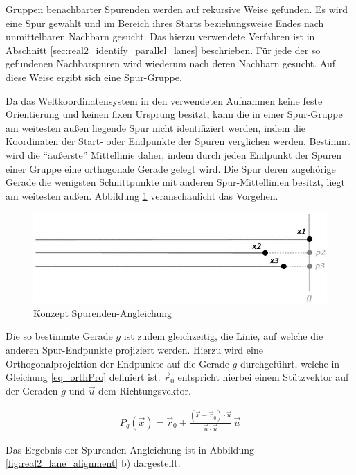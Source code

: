 Gruppen benachbarter Spurenden werden auf rekursive Weise gefunden. Es wird eine Spur gewählt und im
Bereich ihres Starts beziehungsweise Endes nach unmittelbaren Nachbarn gesucht. Das hierzu verwendete
Verfahren ist in Abschnitt \ref{sec:real2_identify_parallel_lanes} beschrieben. Für jede der so gefundenen
Nachbarspuren wird wiederum nach deren Nachbarn gesucht. Auf diese Weise ergibt sich eine Spur-Gruppe.

Da das Weltkoordinatensystem in den verwendeten Aufnahmen keine feste Orientierung und keinen fixen Ursprung besitzt,
kann die in einer Spur-Gruppe am weitesten außen liegende Spur nicht identifiziert werden, indem die
Koordinaten der Start- oder Endpunkte der Spuren verglichen werden.
Bestimmt wird die ``äußerste'' Mittellinie daher, indem durch jeden Endpunkt der Spuren einer Gruppe
eine orthogonale Gerade gelegt wird. Die Spur deren zugehörige Gerade die wenigsten Schnittpunkte
mit anderen Spur-Mittellinien besitzt, liegt am weitesten außen. Abbildung \ref{fig:real2_lane_alignment_concept}
veranschaulicht das Vorgehen.

\begin{figure}[H]
    \centering
    \includegraphics[width=0.5\linewidth]{resources/img/umsetzung/U2/LaneAlignment_concept}
    \caption{Konzept Spurenden-Angleichung}
    \label{fig:real2_lane_alignment_concept}
\end{figure}

Die so bestimmte Gerade $g$ ist zudem gleichzeitig, die Linie, auf welche die anderen Spur-Endpunkte
projiziert werden. Hierzu wird eine Orthogonalprojektion der Endpunkte auf die Gerade $g$ durchgeführt, welche
in Gleichung \ref{eq_orthPro} definiert ist. $\vec r_0$ entspricht hierbei einem Stützvektor auf der Geraden $g$ und
$\vec u$ dem Richtungsvektor.

\begin{ceqn}
\begin{align}
\label{eq_orthPro}
    P_g(\vec x) =  \vec r_0 + \frac{( \vec x - \vec r_0 ) \cdot \vec u}{\vec u \cdot \vec u} \, \vec u
\end{align}
\end{ceqn}

Das Ergebnis der Spurenden-Angleichung ist in Abbildung \ref{fig:real2_lane_alignment} b) dargestellt.

